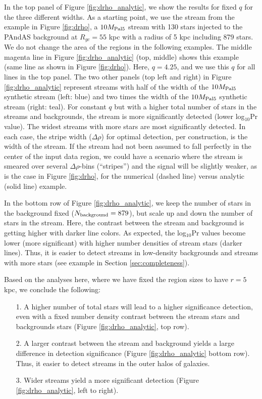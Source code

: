 \documentclass[twocolumn]{aastex631}
\begin{document}
In the top panel of Figure \ref{fig:drho_analytic}, we show the results for fixed $q$ for the three different widths. As a starting point, we use the stream from the example in Figure \ref{fig:drho}, a $10{M}_{\rm Pal 5}$ stream with 130 stars injected to the PAndAS background at $R_{gc}=55$ kpc with a radius of 5 kpc including 879 stars. We do not change the area of the regions in the following examples. The middle magenta line in Figure \ref{fig:drho_analytic} (top, middle) shows this example (same line as shown in Figure \ref{fig:drho}). Here, $q = 4.25$, and we use this $q$ for all lines in the top panel. The two other panels (top left and right) in Figure \ref{fig:drho_analytic} represent streams with half of the width of the $10{M}_{\rm Pal 5}$ synthetic stream (left: blue) and two times the width of the $10{M}_{\rm Pal 5}$ synthetic stream (right: teal). For constant $q$ but with a higher total number of stars in the streams and backgrounds, the stream is more significantly detected (lower log$_{10}$Pr value). The widest streams with more stars are most significantly detected. 
In each case, the stripe width ($\Delta \rho$) for optimal detection, per construction, is the width of the stream. If the stream had not been assumed to fall perfectly in the center of the input data region, we could have a scenario where the stream is smeared over several $\Delta \rho$-bins (``stripes'') and the signal will be slightly weaker, as is the case in Figure \ref{fig:drho}, for the numerical (dashed line) versus analytic (solid line) example.

In the bottom row of Figure \ref{fig:drho_analytic}, we keep the number of stars in the background fixed ($N_{\rm background} = 879$), but scale up and down the number of stars in the stream. Here, the contrast between the stream and background is getting higher with darker line colors. As expected, the log$_{10}$Pr values become lower (more significant) with higher number densities of stream stars (darker lines). Thus, it is easier to detect streams in low-density backgrounds and streams with more stars (see example in Section \ref{sec:completeness}). 

Based on the analyses here, where we have fixed the region sizes to have $r = 5$ kpc, we conclude the following: 
\begin{itemize}
    \item[1.] A higher number of total stars will lead to a higher significance detection, even with a fixed number density contrast between the stream stars and backgrounds stars (Figure \ref{fig:drho_analytic}, top row).  
    \item[2.] A larger contrast between the stream and background yields a large difference in detection significance (Figure \ref{fig:drho_analytic} bottom row). Thus, it easier to detect streams in the outer halos of galaxies.
    \item[3.] Wider streams yield a more significant detection (Figure \ref{fig:drho_analytic}, left to right). 
\end{itemize} 
\end{document}
